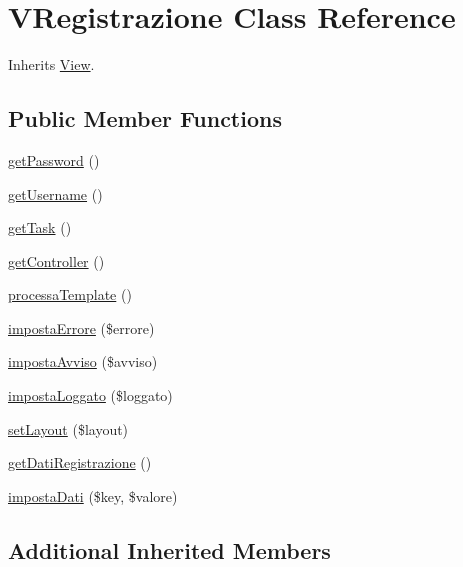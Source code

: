 \hypertarget{class_v_registrazione}{}\section{V\+Registrazione Class Reference}
\label{class_v_registrazione}


Inherits \mbox{\hyperlink{class_view}{View}}.

\subsection*{Public Member Functions}
\begin{DoxyCompactItemize}
\item 
\mbox{\hyperlink{class_v_registrazione_a04e0957baeb7acde9c0c86556da2d43f}{get\+Password}} ()
\item 
\mbox{\hyperlink{class_v_registrazione_a81b37a3c9d639574e394f80c1138c75e}{get\+Username}} ()
\item 
\mbox{\hyperlink{class_v_registrazione_a13871c4434338f02d6f8d430fa0597f2}{get\+Task}} ()
\item 
\mbox{\hyperlink{class_v_registrazione_aa8b89e0bad51878addc1300cd3e95b5c}{get\+Controller}} ()
\item 
\mbox{\hyperlink{class_v_registrazione_a64bdc484fc7074989b4b2c0ebc63aec2}{processa\+Template}} ()
\item 
\mbox{\hyperlink{class_v_registrazione_acb9fd807e8b09b46b95fc55b65edeb36}{imposta\+Errore}} (\$errore)
\item 
\mbox{\hyperlink{class_v_registrazione_a1039d9538af0b568d35b7afaf7cf6ff9}{imposta\+Avviso}} (\$avviso)
\item 
\mbox{\hyperlink{class_v_registrazione_a5b7a368383182af0f44cce5b90b478b9}{imposta\+Loggato}} (\$loggato)
\item 
\mbox{\hyperlink{class_v_registrazione_a702b3376618a26e6c02c05bae65c6b9e}{set\+Layout}} (\$layout)
\item 
\mbox{\hyperlink{class_v_registrazione_a41fedff206621545a767261d3566a32d}{get\+Dati\+Registrazione}} ()
\item 
\mbox{\hyperlink{class_v_registrazione_ab3c0dc76f35667b7a13404d03b7fdb36}{imposta\+Dati}} (\$key, \$valore)
\end{DoxyCompactItemize}
\subsection*{Additional Inherited Members}


